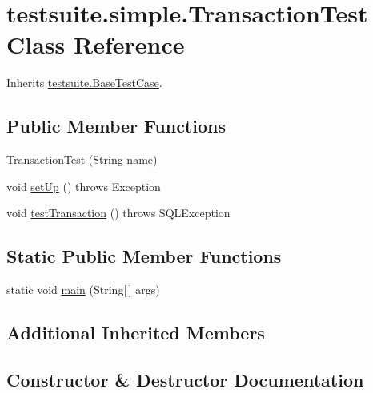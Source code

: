 \hypertarget{classtestsuite_1_1simple_1_1_transaction_test}{}\section{testsuite.\+simple.\+Transaction\+Test Class Reference}
\label{classtestsuite_1_1simple_1_1_transaction_test}


Inherits \mbox{\hyperlink{classtestsuite_1_1_base_test_case}{testsuite.\+Base\+Test\+Case}}.

\subsection*{Public Member Functions}
\begin{DoxyCompactItemize}
\item 
\mbox{\hyperlink{classtestsuite_1_1simple_1_1_transaction_test_a05b3cfd3ac06847339ca8345cda8fe96}{Transaction\+Test}} (String name)
\item 
void \mbox{\hyperlink{classtestsuite_1_1simple_1_1_transaction_test_a28bb243468ffb003fc134f48ff74a740}{set\+Up}} ()  throws Exception 
\item 
void \mbox{\hyperlink{classtestsuite_1_1simple_1_1_transaction_test_afd13b74216f8498467a73d6b4df6ff57}{test\+Transaction}} ()  throws S\+Q\+L\+Exception 
\end{DoxyCompactItemize}
\subsection*{Static Public Member Functions}
\begin{DoxyCompactItemize}
\item 
static void \mbox{\hyperlink{classtestsuite_1_1simple_1_1_transaction_test_a64f59050254d996e0009d60f8cfed9ae}{main}} (String\mbox{[}$\,$\mbox{]} args)
\end{DoxyCompactItemize}
\subsection*{Additional Inherited Members}


\subsection{Constructor \& Destructor Documentation}
\mbox{\label{classtestsuite_1_1simple_1_1_transaction_test_a05b3cfd3ac06847339ca8345cda8fe96}} 
